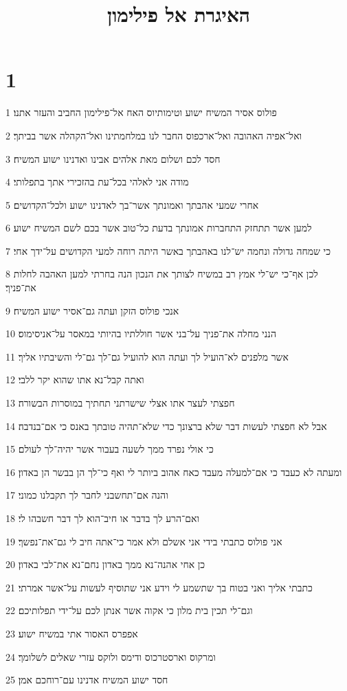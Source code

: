 

\title{האיגרת אל פילימון}


\chapter{1}

\par 1 פולוס אסיר המשיח ישוע וטימותיוס האח אל־פילימון החביב והעזר אתנו׃
\par 2 ואל־אפיה האהובה ואל־ארכפוס החבר לנו במלחמתינו ואל־הקהלה אשר בביתך׃
\par 3 חסד לכם ושלום מאת אלהים אבינו ואדנינו ישוע המשיח׃
\par 4 מודה אני לאלהי בכל־עת בהזכירי אתך בתפלותי׃
\par 5 אחרי שמעי אהבתך ואמונתך אשר־בך לאדנינו ישוע ולכל־הקדושים׃
\par 6 למען אשר תתחזק התחברות אמונתך בדעת כל־טוב אשר בכם לשם המשיח ישוע׃
\par 7 כי שמחה גדולה ונחמה יש־לנו באהבתך באשר היתה רוחה למעי הקדושים על־ידך אחי׃
\par 8 לכן אף־כי יש־לי אמץ רב במשיח לצותך את הנכון הנה בחרתי למען האהבה לחלות את־פניך׃
\par 9 אנכי פולוס הזקן ועתה גם־אסיר ישוע המשיח׃
\par 10 הנני מחלה את־פניך על־בני אשר חוללתיו בהיותי במאסר על־אניסימוס׃
\par 11 אשר מלפנים לא־הועיל לך ועתה הוא להועיל גם־לך גם־לי והשיבתיו אליך׃
\par 12 ואתה קבל־נא אתו שהוא יקר ללבי׃
\par 13 חפצתי לעצר אתו אצלי שישרתני תחתיך במוסרות הבשורה׃
\par 14 אבל לא חפצתי לעשות דבר שלא ברצונך כדי שלא־תהיה טובתך באנס כי אם־בנדבה׃
\par 15 כי אולי נפרד ממך לשעה בעבור אשר יהיה־לך לעולם׃
\par 16 ומעתה לא כעבד כי אם־למעלה מעבד כאח אהוב ביותר לי ואף כי־לך הן בבשר הן באדון׃
\par 17 והנה אם־תחשבני לחבר לך תקבלנו כמוני׃
\par 18 ואם־הרע לך בדבר או חיב־הוא לך דבר חשבהו לי׃
\par 19 אני פולוס כתבתי בידי אני אשלם ולא אמר כי־אתה חיב לי גם־את־נפשך׃
\par 20 כן אחי אהנה־נא ממך באדון נחם־נא את־לבי באדון׃
\par 21 כתבתי אליך ואני בטוח בך שתשמע לי וידע אני שתוסיף לעשות על־אשר אמרתי׃
\par 22 וגם־לי תכין בית מלון כי אקוה אשר אנתן לכם על־ידי תפלותיכם׃
\par 23 אפפרס האסור אתי במשיח ישוע׃
\par 24 ומרקוס וארסטרכוס ודימס ולוקס עזרי שאלים לשלומך׃
\par 25 חסד ישוע המשיח אדנינו עם־רוחכם אמן׃


